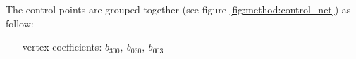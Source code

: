 The control points are grouped together (see figure \ref{fig:method:control_net}) as follow:

\begin{itemize}\label{eq:method:control_coefficients}
	\item [vertex coefficients:]  $b_{300},\ b_{030},\ b_{003}$\\
\end{itemize}

